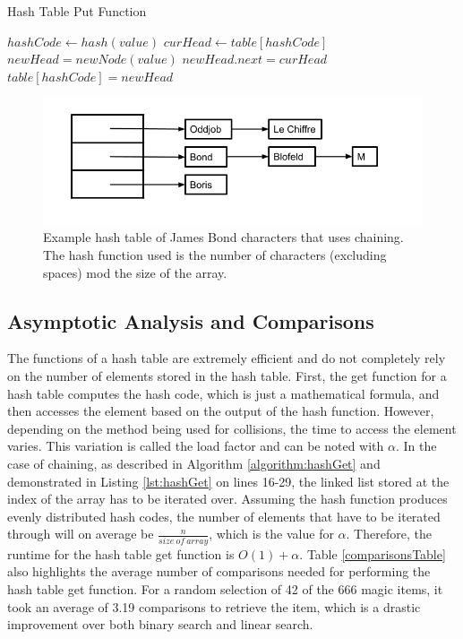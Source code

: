\documentclass[letterpaper, 10pt,DIV=13]{scrartcl}
\numberwithin{equation}{section} %
\numberwithin{figure}{section} %
\numberwithin{table}{section} %
\begin{document}
\begin{algorithm}
  \caption{Hash Table Put Function}
  \label{algorithm:hashPut}
  \begin{algorithmic}[1]
        \State $hashCode \gets hash(value)$ 
        \State $curHead \gets table[hashCode]$ 
        \State $newHead = new Node(value)$ 
          \State $newHead.next = curHead$ 
        \EndIf
        \State $table[hashCode] = newHead$ 
      \EndProcedure
  \end{algorithmic}
\end{algorithm}

\begin{figure}[ht] 
  \centering 
  \includegraphics[width=15cm]{hashing}
  \caption{Example hash table of James Bond characters that uses chaining. The hash function used is the number of characters (excluding spaces) mod the size of the array.}
  \label{figure:hashing}
\end{figure}

\subsection{Asymptotic Analysis and Comparisons}
The functions of a hash table are extremely efficient and do not completely rely on the number of elements stored in the hash table. First, the get function for a hash table computes the hash code, which is just a mathematical formula, and then accesses the element based on the output of the hash function. However, depending on the method being used for collisions, the time to access the element varies. This variation is called the load factor and can be noted with $\alpha$. In the case of chaining, as described in Algorithm \ref{algorithm:hashGet} and demonstrated in Listing \ref{lst:hashGet} on lines 16-29, the linked list stored at the index of the array has to be iterated over. Assuming the hash function produces evenly distributed hash codes, the number of elements that have to be iterated through will on average be $\frac{n}{size~of~array}$, which is the value for $\alpha$. Therefore, the runtime for the hash table get function is $O(1) + \alpha$. Table \ref{comparisonsTable} also highlights the average number of comparisons needed for performing the hash table get function. For a random selection of 42 of the 666 magic items, it took an average of 3.19 comparisons to retrieve the item, which is a drastic improvement over both binary search and linear search.
\end{document}
